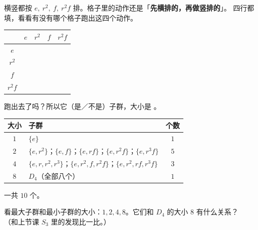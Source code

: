 \begin{dongshou}[再填一张 \(4\) 阶的表：\(H=\{e,\ r^2,\ f,\ r^2f\}\)]
  横竖都按 \(e,\ r^2,\ f,\ r^2f\) 排。格子里的动作还是「\textbf{先横排的，再做竖排的}」。
  四行都填，看看有没有哪个格子跑出这四个动作。

  \begin{center}
  \begin{tabular}{@{}c|cccc@{}}
    \toprule
     & \(e\) & \(r^2\) & \(f\) & \(r^2f\) \\
    \midrule
    \rule{0pt}{3ex}\(e\) & & & & \\
    \midrule
    \rule{0pt}{3ex}\(r^2\) & & & & \\
    \midrule
    \rule{0pt}{3ex}\(f\) & & & & \\
    \midrule
    \rule{0pt}{3ex}\(r^2f\) & & & & \\
    \bottomrule
  \end{tabular}
  \end{center}
  跑出去了吗？\underline{\hspace{3em}}\quad 所以它\underline{\hspace{2em}}（是／不是）子群，大小是 \underline{\hspace{1.2em}}。
\end{dongshou}

\begin{example}[\(D_4\) 里全部的子群]
  \begin{center}
  \begin{tabular}{@{}clc@{}}
    \toprule
    大小 & 子群 & 个数 \\
    \midrule
    \(1\) & \(\{e\}\) & \(1\) \\
    \(2\) & \(\{e,r^2\}\)；\(\{e,f\}\)；\(\{e,rf\}\)；\(\{e,r^2f\}\)；\(\{e,r^3f\}\) & \(5\) \\
    \(4\) & \(\{e,r,r^2,r^3\}\)；\(\{e,r^2,f,r^2f\}\)；\(\{e,r^2,rf,r^3f\}\) & \(3\) \\
    \(8\) & \(D_4\)（全部八个） & \(1\) \\
    \bottomrule
  \end{tabular}
  \end{center}
  一共 \(10\) 个。
\end{example}

\begin{sikao}
  看最大子群和最小子群的大小：\(1,2,4,8\)。它们和 \(D_4\) 的大小 \(8\) 有什么关系？\\[4pt]
  （和上节课 \(S_3\) 里的发现比一比。）
\end{sikao}

